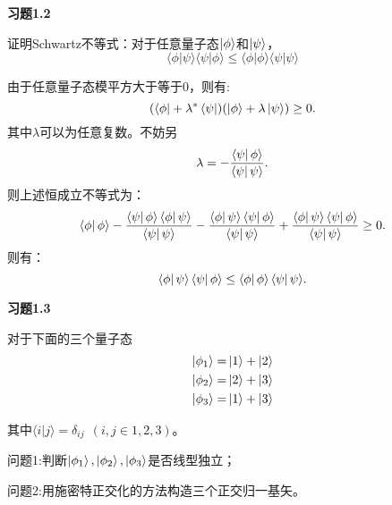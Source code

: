 \documentclass[reqno,a4paper,12pt]{amsart}
\begin{document}
\textbf{习题1.2}

证明Schwartz不等式：对于任意量子态$\ket{\phi}$和$\ket{\psi}$，
\[
	\langle \phi \vert \psi \rangle \langle \psi \vert \phi \rangle \leq \langle \phi \vert \phi \rangle \langle \psi \vert \psi \rangle
\]

\begin{tcolorbox}[breakable, colback = black!5!white, colframe = black]

由于任意量子态模平方大于等于0，则有:
\[
	(\bra{\phi} + \lambda^*\bra{\psi})(\ket{\phi} + \lambda\ket{\psi}) \geq 0.
\]
其中$\lambda$可以为任意复数。不妨另
\[
	\lambda = -\frac{\bra{\psi} \phi \rangle}{\bra{\psi} \psi \rangle}.
\]
则上述恒成立不等式为：
\[
	\bra{\phi} \phi \rangle - \frac{\bra{\psi} \phi \rangle \bra{\phi} \psi \rangle}{\bra{\psi} \psi \rangle} - \frac{\bra{\phi} \psi \rangle \bra{\psi} \phi \rangle}{\bra{\psi} \psi \rangle} + \frac{\bra{\phi} \psi \rangle \bra{\psi} \phi \rangle}{\bra{\psi} \psi \rangle} \geq 0.
\]
则有：
\[
	\bra{\phi} \psi \rangle \bra{\psi} \phi \rangle \leq \bra{\phi} \phi \rangle \bra{\psi} \psi \rangle.
\]

\end{tcolorbox}

\textbf{习题1.3}

对于下面的三个量子态
\begin{align*}
	\ket{\phi_1} =& \ket{1} + \ket{2} \\
	\ket{\phi_2} =& \ket{2} + \ket{3} \\
	\ket{\phi_3} =& \ket{1} + \ket{3}
\end{align*}

其中$\langle i \vert j \rangle = \delta_{ij} ~~ (i,j \in 1,2,3)$。

问题1:判断$\ket{\phi_1},\ket{\phi_2},\ket{\phi_3}$是否线型独立；

问题2:用施密特正交化的方法构造三个正交归一基矢。
\end{document}
